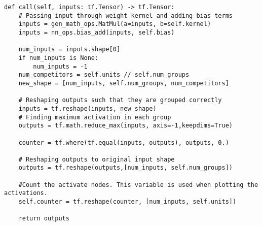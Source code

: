 \begin{lstlisting}[caption={Python implementation for the custom activation function used to define the maxout layer.},captionpos=b, label={lst:max_out}]
def call(self, inputs: tf.Tensor) -> tf.Tensor:
    # Passing input through weight kernel and adding bias terms
    inputs = gen_math_ops.MatMul(a=inputs, b=self.kernel)
    inputs = nn_ops.bias_add(inputs, self.bias)

    num_inputs = inputs.shape[0]
    if num_inputs is None:
        num_inputs = -1
    num_competitors = self.units // self.num_groups
    new_shape = [num_inputs, self.num_groups, num_competitors]

    # Reshaping outputs such that they are grouped correctly
    inputs = tf.reshape(inputs, new_shape)
    # Finding maximum activation in each group
    outputs = tf.math.reduce_max(inputs, axis=-1,keepdims=True)

    counter = tf.where(tf.equal(inputs, outputs), outputs, 0.)
    
    # Reshaping outputs to original input shape
    outputs = tf.reshape(outputs,[num_inputs, self.num_groups])   

    #Count the activate nodes. This variable is used when plotting the activations.
    self.counter = tf.reshape(counter, [num_inputs, self.units])

    return outputs
\end{lstlisting}
\newpage